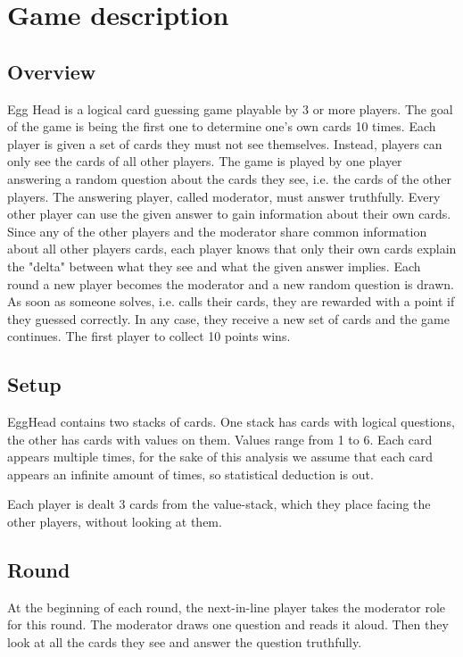\documentclass{article}
\begin{document}
\section{Game description}

\subsection{Overview}

Egg Head is a logical card guessing game playable by 3 or more players. 
The goal of the game is being the first one to determine one's own cards 10 times.
Each player is given a set of cards they must not see themselves. Instead, players can only see the cards of all other players.
The game is played by one player answering a random question about the cards they see, i.e. the cards of the other players. 
The answering player, called moderator, must answer truthfully.
Every other player can use the given answer to gain information about their own cards.
Since any of the other players and the moderator share common information about all other players cards, each player knows that only their own cards explain the "delta" between what they see and what the given answer implies.
Each round a new player becomes the moderator and a new random question is drawn.
As soon as someone solves, i.e. calls their cards, they are rewarded with a point if they guessed correctly. In any case, they receive a new set of cards and the game continues. 
The first player to collect 10 points wins.

\subsection{Setup}

EggHead contains two stacks of cards. One stack has cards with logical questions, the other has cards with values on them.
Values range from 1 to 6. Each card appears multiple times, for the sake of this analysis we assume that each card appears an infinite amount of times, so statistical deduction is out.

Each player is dealt 3 cards from the value-stack, which they place facing the other players, without looking at them.

\subsection{Round}

At the beginning of each round, the next-in-line player takes the moderator role for this round. 
The moderator draws one question and reads it aloud. Then they look at all the cards they see and answer the question truthfully.
\end{document}
